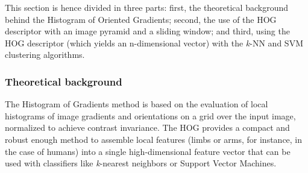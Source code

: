 \documentclass[../main.tex]{subfiles}
\begin{document}
This section is hence divided in three parts: first, the theoretical background behind the Histogram of Oriented Gradients; second, the use of the HOG descriptor with an image pyramid and a sliding window; and third, using the HOG descriptor (which yields an n-dimensional vector) with the \emph{k}-NN and SVM clustering algorithms.

\subsubsection{Theoretical background}
The Histogram of Gradients method is based on the evaluation of local histograms of image gradients and orientations on a grid over the input image, normalized to achieve contrast invariance. The HOG provides a compact and robust enough method to assemble local features (limbs or arms, for instance, in the case of humans) into a single high-dimensional feature vector that can be used with classifiers like \emph{k}-nearest neighbors or Support Vector Machines.
\end{document}
